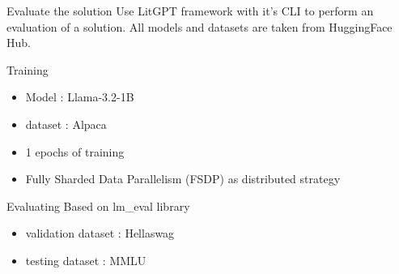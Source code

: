 \begin{frame}{Evaluate the solution}
    Use LitGPT framework with it's CLI to perform an evaluation of a solution. All models and datasets are taken from HuggingFace Hub.
    \begin{block}{Training}
        \begin{itemize}
            \item Model : Llama-3.2-1B
            \item dataset : Alpaca
            \item 1 epochs of training
            \item Fully Sharded Data Parallelism (FSDP) as distributed strategy
        \end{itemize}
    \end{block}

    \begin{block}{Evaluating}
        Based on lm\_eval library
        \begin{itemize}
            \item validation dataset : Hellaswag
            \item testing dataset : MMLU
        \end{itemize}
    \end{block}

    
\end{frame}

